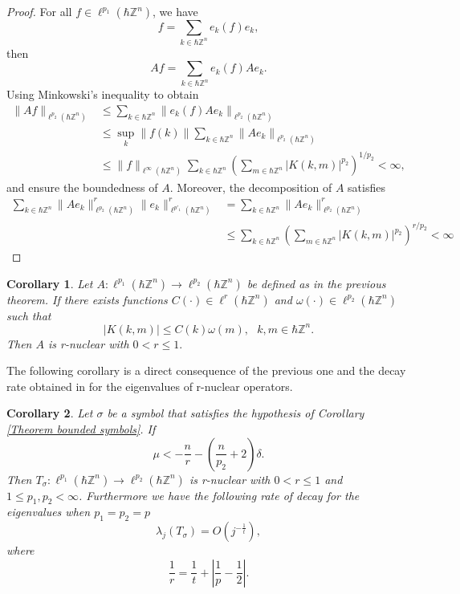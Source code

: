 \documentclass[pdflatex,sn-mathphys-num]{sn-jnl}%
\theoremstyle{thmstyleone}%
\newtheorem{corollary}{Corollary}
\theoremstyle{thmstyletwo}%
\theoremstyle{thmstylethree}%
\begin{document}
\begin{proof}
    For all $f\in\ell^{p_1}(\hbar\mathbb{Z}^n)$, we have
    \[f=\sum_{k\in\hbar\mathbb{Z}^n} e_k(f)e_k, \]
    then 
    \[Af=\sum_{k\in\hbar\mathbb{Z}^n} e_k(f)Ae_k. \]
    Using Minkowski's inequality to obtain 
    \begin{align*}
        \|Af \|_{\ell^{p_2}(\hbar\mathbb{Z}^n)}&\leq \sum_{k\in\hbar\mathbb{Z}^n} \|e_k(f)Ae_k \|_{\ell^{p_2}(\hbar\mathbb{Z}^n)}\\
        &\leq \sup_{k} \|f(k)\| \sum_{k\in\hbar\mathbb{Z}^n} \|Ae_k \|_{\ell^{p_2}(\hbar\mathbb{Z}^n)}\\
        & \leq \|f\|_{\ell^{\infty}(\hbar\mathbb{Z}^n)}  \sum_{k\in\hbar\mathbb{Z}^n}\left(\sum_{m\in\hbar\mathbb{Z}^n} |K(k,m)|^{p_2} \right)^{1/p_2} <\infty,
    \end{align*}
    and ensure the boundedness of  $A$. Moreover, the decomposition of $A$ satisfies 
    \begin{align*}
    \sum_{k\in\hbar\mathbb{Z}^n} \|Ae_k\|^r_{\ell^{p_2}(\hbar\mathbb{Z}^n)} \|e_k\|^r_{\ell^{p'_1}(\hbar\mathbb{Z}^n)}&=\sum_{k\in\hbar\mathbb{Z}^n} \|Ae_k\|^r_{\ell^{p_2}(\hbar\mathbb{Z}^n)}\\
    &\leq \sum_{k\in\hbar\mathbb{Z}^n}\left(\sum_{m\in\hbar\mathbb{Z}^n} |K(k,m)|^{p_2} \right)^{r/p_2}<\infty
    \end{align*}
\end{proof}
\begin{corollary}
    Let $A:\ell^{p_1}(\hbar\mathbb{Z}^n)\to\ell^{p_2}(\hbar\mathbb{Z}^n)$ be defined as in the previous theorem. If there exists functions $C(\cdot)\in \ell^{r}(\hbar\mathbb{Z}^n)$ and $\omega(\cdot)\in \ell^{p_2}(\hbar\mathbb{Z}^n)$ such that
    \[|K(k,m)|\leq C(k)\omega(m), \ \ \  k,m\in\hbar\mathbb{Z}^n.\]
    Then $A$ is r-nuclear with $0<r\leq 1.$
\end{corollary}
The following corollary is a direct consequence of the previous one and the decay rate obtained in \cite{reinov2013distribution} for the eigenvalues of r-nuclear operators.
\begin{corollary}\label{eigenvalue decay}
    Let $\sigma$ be a symbol that satisfies the hypothesis of Corollary \ref{Theorem bounded symbols}. If 
    \[\mu<-\frac{n}{r}-\left(\frac{n}{p_2}+2  \right)\delta. \]
     Then $T_\sigma:\ell^{p_1}(\hbar\mathbb{Z}^n)\to\ell^{p_2}(\hbar\mathbb{Z}^n)$ is r-nuclear with $0<r\leq 1$ and $1\leq p_1,p_2<\infty$. Furthermore we have the following rate of decay for the eigenvalues when $p_1=p_2=p$
    \[ \lambda_j(T_\sigma)=O\left(j^{-\frac{1}{t}}\right), \]
    where 
    \[\frac{1}{r}=\frac{1}{t}+\left|\frac{1}{p}-\frac{1}{2}\right|.\]
\end{corollary}
\end{document}
